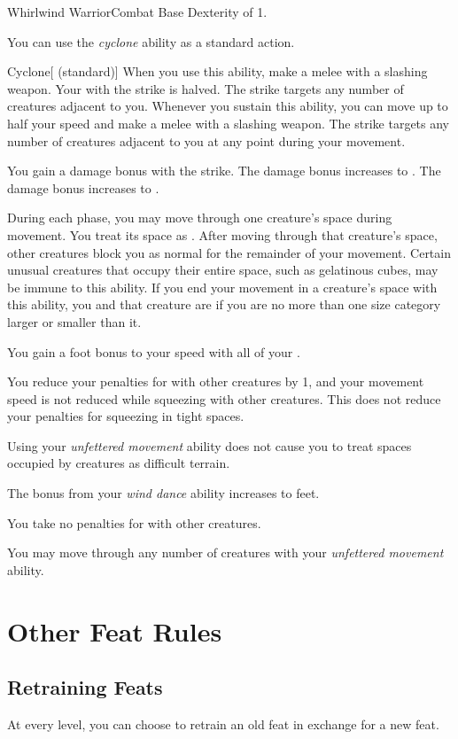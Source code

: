     \begin{feat}{Whirlwind Warrior}{Combat}
        \featpre Base Dexterity of 1.

         You can use the \textit{cyclone} ability as a standard action.
        \begin{freeability}{Cyclone}[ (standard)]
            When you use this ability, make a melee  with a slashing weapon.
            Your  with the strike is halved.
            The strike targets any number of creatures adjacent to you.
            Whenever you sustain this ability, you can move up to half your speed and make a melee  with a slashing weapon.
            The strike targets any number of creatures adjacent to you at any point during your movement.

            \rankline
             You gain a  damage bonus with the strike.
             The damage bonus increases to .
             The damage bonus increases to .
        \end{freeability}

         During each phase, you may move through one creature's space during movement.
        You treat its space as .
        After moving through that creature's space, other creatures block you as normal for the remainder of your movement.
        Certain unusual creatures that occupy their entire space, such as gelatinous cubes, may be immune to this ability.
        If you end your movement in a creature's space with this ability, you and that creature are  if you are no more than one size category larger or smaller than it.

         You gain a  foot bonus to your speed with all of your .

         You reduce your penalties for  with other creatures by 1, and your movement speed is not reduced while squeezing with other creatures.
        This does not reduce your penalties for squeezing in tight spaces.

         Using your \textit{unfettered movement} ability does not cause you to treat spaces occupied by creatures as difficult terrain.

         The bonus from your \textit{wind dance} ability increases to  feet.

         You take no penalties for  with other creatures.

         You may move through any number of creatures with your \textit{unfettered movement} ability.
    \end{feat}

\section{Other Feat Rules}

    \subsection{Retraining Feats}
        At every level, you can choose to retrain an old feat in exchange for a new feat.

